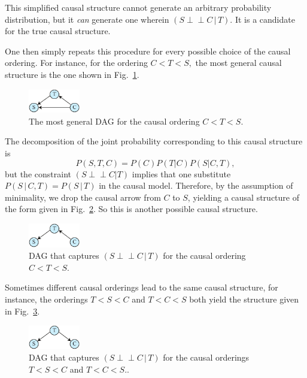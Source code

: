 \documentclass[12pt,onecolumn,nofootinbib]{revtex4-2}
\def\indep{\perp\!\!\!\!\perp}
\begin{document}
This simplified causal structure cannot generate an arbitrary probability
distribution, but it \emph{can }generate one wherein $(S\indep C\,|\,T).$
It is a candidate for the true causal structure.


One then simply repeats this procedure for every possible choice of the
causal ordering. For instance, for the ordering $C<T<S,$ the most general
causal structure is the one shown in Fig.~\ref{fig:smoke-CTS-gen}.
\begin{figure}[h]
	\centering
	\includegraphics[width=0.2\textwidth]{smoke-rev-gen}
 \caption{The most general DAG for the causal ordering $C<T<S$.}
       \label{fig:smoke-CTS-gen}
\end{figure}
The decomposition of the joint probability corresponding to this causal structure is%
\begin{equation*}
P(S,T,C)=P(C)P(T|C)P(S|C,T),
\end{equation*}%
but the constraint $(S\indep C|T)$ implies that one substitute $P(S\,|\,C,T)=P(S\,|\,T)$
in the causal model.  Therefore, by the assumption of minimality, we drop the causal arrow
from $C$ to $S$, yielding 
a causal structure of the form given in Fig.~\ref{fig:smoke-CTS-ind}. So this is another possible causal structure.
\begin{figure}[h]
	\centering
	\includegraphics[width=0.2\textwidth]{smoke-rev-ind}
 \caption{DAG that captures $(S\indep C\,|\, T)$ for the causal ordering $C<T<S$.}
       \label{fig:smoke-CTS-ind}
\end{figure}


Sometimes different causal orderings lead to the same causal structure, for
instance, the orderings $T<S<C$ and $T<C<S$ both yield the structure given in Fig.~\ref{fig:smoke-TSC-ind}. %
\begin{figure}[h]
	\centering
	\includegraphics[width=0.2\textwidth]{smoke-TSC-ind}
 \caption{DAG that captures $(S\indep C\,|\, T)$ for the causal orderings $T<S<C$ and $T<C<S$..}
       \label{fig:smoke-TSC-ind}
\end{figure}
\end{document}
